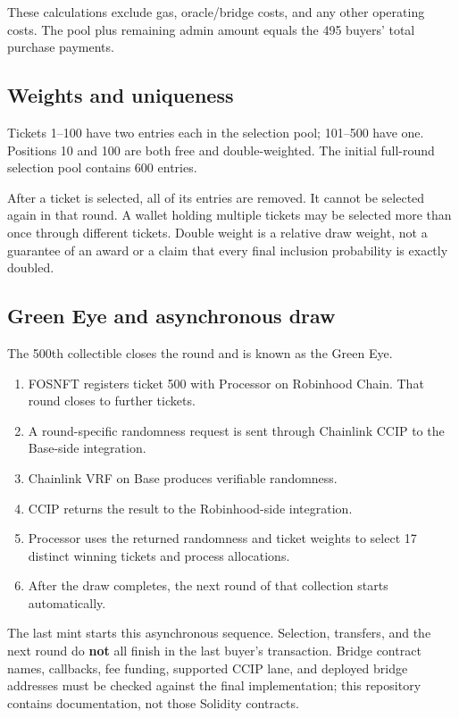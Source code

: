 \documentclass[
  10pt,
  letterpaper,
]{article}
\providecommand{\tightlist}{%
  \setlength{\itemsep}{0pt}\setlength{\parskip}{0pt}}
\begin{document}
These calculations exclude gas, oracle/bridge costs, and any other
operating costs. The pool plus remaining admin amount equals the 495
buyers' total purchase payments.

\subsection{Weights and uniqueness}\label{weights-and-uniqueness}

Tickets 1--100 have two entries each in the selection pool; 101--500
have one. Positions 10 and 100 are both free and double-weighted. The
initial full-round selection pool contains 600 entries.

After a ticket is selected, all of its entries are removed. It cannot be
selected again in that round. A wallet holding multiple tickets may be
selected more than once through different tickets. Double weight is a
relative draw weight, not a guarantee of an award or a claim that every
final inclusion probability is exactly doubled.

\subsection{Green Eye and asynchronous
draw}\label{green-eye-and-asynchronous-draw}

The 500th collectible closes the round and is known as the Green Eye.

\begin{enumerate}
\def\labelenumi{\arabic{enumi}.}
\tightlist
\item
  FOSNFT registers ticket 500 with Processor on Robinhood Chain. That
  round closes to further tickets.
\item
  A round-specific randomness request is sent through Chainlink CCIP to
  the Base-side integration.
\item
  Chainlink VRF on Base produces verifiable randomness.
\item
  CCIP returns the result to the Robinhood-side integration.
\item
  Processor uses the returned randomness and ticket weights to select 17
  distinct winning tickets and process allocations.
\item
  After the draw completes, the next round of that collection starts
  automatically.
\end{enumerate}

The last mint starts this asynchronous sequence. Selection, transfers,
and the next round do \textbf{not} all finish in the last buyer's
transaction. Bridge contract names, callbacks, fee funding, supported
CCIP lane, and deployed bridge addresses must be checked against the
final implementation; this repository contains documentation, not those
Solidity contracts.
\end{document}
